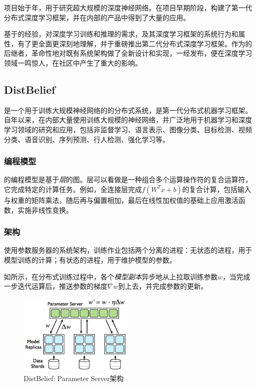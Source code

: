 \begin{content}

项目始于年，用于研究超大规模的深度神经网络。在项目早期阶段，构建了第一代分布式深度学习框架，并在内部的产品中得到了大量的应用。

基于的经验，对深度学习训练和推理的需求，及其深度学习框架的系统行为和属性，有了更全面更深刻地理解，并于重磅推出第二代分布式深度学习框架\tf{}。\tf{}作为的后继者，革命性地对既有系统架构做了全新设计和实现，\tf{}一经发布，便在深度学习领域一鸣惊人，在社区中产生了重大的影响。


\subsection{DistBelief}


是一个用于训练大规模神经网络的的分布式系统，是第一代分布式机器学习框架。自年以来，在内部大量使用训练大规模的神经网络，并广泛地用于机器学习和深度学习领域的研究和应用，包括非监督学习、语言表示、图像分类、目标检测、视频分类、语音识别、序列预测、行人检测、强化学习等。

\subsubsection{编程模型}

的编程模型是基于\emph{层}的图。层可以看做是一种组合多个运算操作符的复合运算符，它完成特定的计算任务。例如，全连接层完成$f({W^T}x + b)$的复合计算，包括输入与权重的矩阵乘法，随后再与偏置相加，最后在线性加权值的基础上应用激活函数，实施非线性变换。


\subsubsection{架构}


使用参数服务器的系统架构，训练作业包括两个分离的进程：无状态的进程，用于模型训练的计算；有状态的进程，用于维护模型的参数。

如所示，在分布式训练过程中，各个\emph{模型副本}异步地从上拉取训练参数$w$，当完成一步迭代运算后，推送参数的梯度$ \nabla w $到上去，并完成参数的更新。

\begin{figure}[H]
\centering
\includegraphics[width=0.5\textwidth]{figures/parameter-server.png}
\caption{DistBelief: Parameter Server架构}
 \label{fig:parameter-server}
\end{figure}


\end{content}
